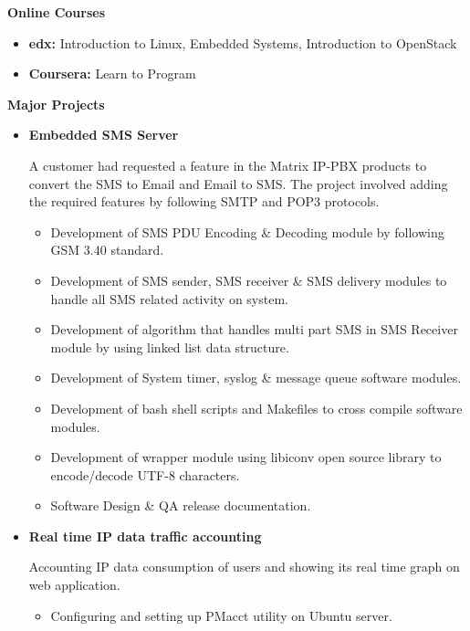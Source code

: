 \documentclass[letterpaper,10pt]{article}
\newcommand{\resitem}[1]{\item #1 \vspace{-2pt}}
\newcommand{\resheading}[1]{{\large \colorbox{mygrey}{\begin{minipage}{\textwidth}{\textbf{#1 \vphantom{p\^{E}}}}\end{minipage}}}}
\begin{document}
\resheading{Online Courses}
\begin{itemize}
\item \textbf{edx:} Introduction to Linux, Embedded Systems, Introduction to OpenStack
\item \textbf{Coursera:} Learn to Program

\end{itemize}
\resheading{Major Projects}
\begin{itemize}

\item
    \textbf{Embedded SMS Server}
    
    A customer had requested a feature in the Matrix IP-PBX products to convert the SMS to Email and Email to SMS. The project involved adding the required features by following SMTP and POP3 protocols.

	\begin{itemize}
		\resitem{Development of SMS PDU Encoding \& Decoding module by following GSM 3.40 standard.}
		
		\resitem{Development of SMS sender, SMS receiver \& SMS delivery modules to handle all SMS related activity on system.}
	    
	    \resitem{Development of algorithm that handles multi part SMS in SMS Receiver module by using linked list data structure.}
	    
	    \resitem{Development of System timer, syslog \& message queue software modules.}
	    
	    \resitem{Development of bash shell scripts and Makefiles to cross compile software modules.}
        
        \resitem{Development of wrapper module using libiconv open source library to encode/decode UTF-8 characters.}
        
        \resitem{Software Design \& QA release documentation.}
		
	\end{itemize}
	
\item
    \textbf{Real time IP data traffic accounting}
    
    Accounting IP data consumption of users and showing its real time graph on web application.
    
	\begin{itemize}
	    \resitem{Configuring and setting up PMacct utility on Ubuntu server.}
	

\end{itemize}
\end{itemize}
\end{document}
